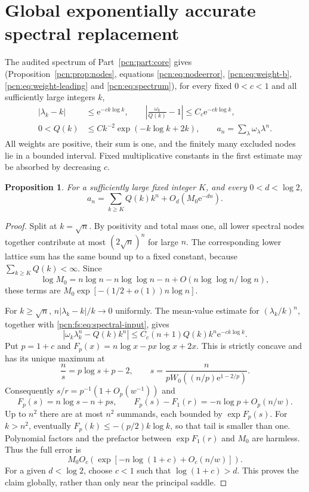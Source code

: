 \documentclass[11pt,letterpaper]{article}
\newtheorem{proposition}[theorem]{Proposition}
\theoremstyle{remark}\newtheorem{remark}[theorem]{Remark}
\newcommand{\ee}{\mathrm e}
\begin{document}
\section{Global exponentially accurate spectral replacement}
The audited spectrum of Part~\ref{pcn:part:core} gives (Proposition~\ref{pcn:prop:nodes}, equations \eqref{pcn:eq:nodeerror}, \eqref{pcn:eq:weight-b}, \eqref{pcn:eq:weight-leading} and \eqref{pcn:eq:spectrum}), for every fixed $0<c<1$ and all sufficiently large integers $k$,
\begin{align}
 |\lambda_k-k|&\le\ee^{-ck\log k},\qquad
 \left|\frac{\omega_k}{Q(k)}-1\right|
     \le C_c\ee^{-ck\log k},\label{pcn:fs:eq:spectral-input}\\
 0<Q(k)&\le Ck^{-2}\exp(-k\log k+2k),\qquad
 a_n=\sum_\lambda\omega_\lambda\lambda^n.\label{pcn:fs:eq:weight-bound}
\end{align}
All weights are positive, their sum is one, and the finitely many excluded nodes lie in a bounded interval. Fixed multiplicative constants in the first estimate may be absorbed by decreasing $c$.

\begin{proposition}\label{pcn:fs:prop:replace}
For a sufficiently large fixed integer $K$, and every $0<d<\log2$,
\[
 a_n=\sum_{k\ge K}Q(k)k^n+O_d(M_0\ee^{-dn}).
\]
\end{proposition}
\begin{proof}
Split at $k=\sqrt n$. By positivity and total mass one, all lower spectral nodes together contribute at most $(2\sqrt n)^n$ for large $n$. The corresponding lower lattice sum has the same bound up to a fixed constant, because $\sum_{k\ge K}Q(k)<\infty$. Since
\[
 \log M_0=n\log n-n\log\log n-n
                +O(n\log\log n/\log n),
\]
these terms are $M_0\exp[-(1/2+o(1))n\log n]$.

For $k\ge\sqrt n$, $n|\lambda_k-k|/k\to0$ uniformly. The mean-value estimate for $(\lambda_k/k)^n$, together with \eqref{pcn:fs:eq:spectral-input}, gives
\[
 |\omega_k\lambda_k^n-Q(k)k^n|
 \le C_c(n+1)Q(k)k^n\ee^{-ck\log k}.
\]
Put $p=1+c$ and $F_p(x)=n\log x-px\log x+2x$. This is strictly concave and has its unique maximum at
\[
 \frac n s=p\log s+p-2,\qquad
 s=\frac n{pW_0((n/p)\ee^{1-2/p})}.
\]
Consequently $s/r=p^{-1}(1+O_p(w^{-1}))$ and
\begin{equation}\label{pcn:fs:eq:modified-saddle}
 F_p(s)=n\log s-n+ps,\qquad
 F_p(s)-F_1(r)=-n\log p+O_p(n/w).
\end{equation}
Up to $n^2$ there are at most $n^2$ summands, each bounded by $\exp F_p(s)$. For $k>n^2$, eventually $F_p(k)\le-(p/2)k\log k$, so that tail is smaller than one. Polynomial factors and the prefactor between $\exp F_1(r)$ and $M_0$ are harmless. Thus the full error is
\[
 M_0O_c\left(\exp[-n\log(1+c)+O_c(n/w)]\right).
\]
For a given $d<\log2$, choose $c<1$ such that $\log(1+c)>d$. This proves the claim globally, rather than only near the principal saddle.
\end{proof}
\end{document}
